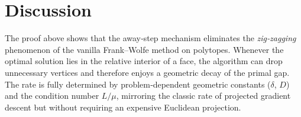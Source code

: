 \documentclass{article}
\begin{document}
\section*{Discussion}
The proof above shows that the away‑step mechanism eliminates the
\emph{zig‑zagging} phenomenon of the vanilla Frank–Wolfe method on polytopes.
Whenever the optimal solution lies in the relative interior of a face,
the algorithm can drop unnecessary vertices and therefore enjoys a
geometric decay of the primal gap. The rate is fully determined by
problem‑dependent geometric constants ($\delta$, $D$) and the condition number
$L/\mu$, mirroring the classic rate of projected gradient descent but without
requiring an expensive Euclidean projection.
\end{document}
